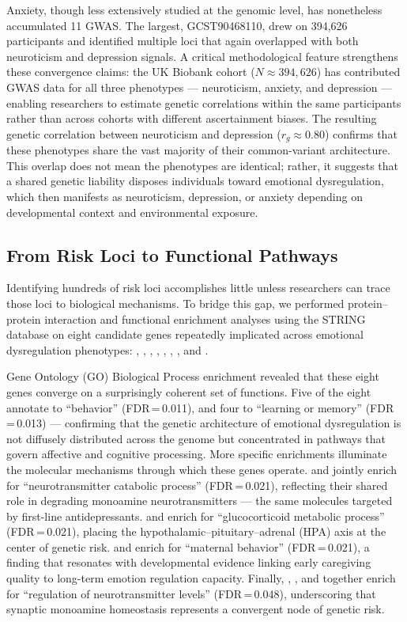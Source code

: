 Anxiety, though less extensively studied at the genomic level, has nonetheless
accumulated 11 GWAS.
The largest, GCST90468110, drew on 394,626 participants and identified multiple
loci that again overlapped with both neuroticism and depression signals.
A critical methodological feature strengthens these convergence claims: the UK
Biobank cohort ($N \approx 394{,}626$) has contributed GWAS data for all three
phenotypes — neuroticism, anxiety, and depression — enabling researchers to
estimate genetic correlations within the same participants rather than across
cohorts with different ascertainment biases.
The resulting genetic correlation between neuroticism and depression
($r_g \approx 0.80$) confirms that these phenotypes share the vast majority of
their common-variant architecture.
This overlap does not mean the phenotypes are identical; rather, it suggests
that a shared genetic liability disposes individuals toward emotional
dysregulation, which then manifests as neuroticism, depression, or anxiety
depending on developmental context and environmental exposure.

\subsection*{From Risk Loci to Functional Pathways}

Identifying hundreds of risk loci accomplishes little unless researchers can
trace those loci to biological mechanisms.
To bridge this gap, we performed protein--protein interaction and functional
enrichment analyses using the STRING database on eight candidate genes
repeatedly implicated across emotional dysregulation phenotypes:
, , , , ,
, , and .

Gene Ontology (GO) Biological Process enrichment revealed that these eight
genes converge on a surprisingly coherent set of functions.
Five of the eight annotate to ``behavior'' (FDR\,=\,0.011), and four to
``learning or memory'' (FDR\,=\,0.013) — confirming that the genetic
architecture of emotional dysregulation is not diffusely distributed across the
genome but concentrated in pathways that govern affective and cognitive
processing.
More specific enrichments illuminate the molecular mechanisms through which
these genes operate.
 and  jointly enrich for ``neurotransmitter catabolic
process'' (FDR\,=\,0.021), reflecting their shared role in degrading
monoamine neurotransmitters — the same molecules targeted by first-line
antidepressants.
 and  enrich for ``glucocorticoid metabolic process''
(FDR\,=\,0.021), placing the hypothalamic--pituitary--adrenal (HPA) axis at
the center of genetic risk.
 and  enrich for ``maternal behavior''
(FDR\,=\,0.021), a finding that resonates with developmental evidence linking
early caregiving quality to long-term emotion regulation capacity.
Finally, , , and  together enrich for
``regulation of neurotransmitter levels'' (FDR\,=\,0.048), underscoring that
synaptic monoamine homeostasis represents a convergent node of genetic risk.

